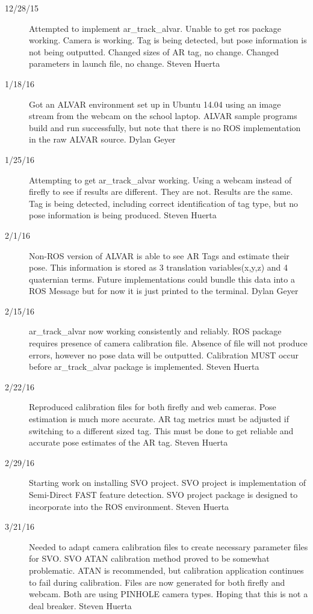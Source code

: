 \begin{description}
\item [12/28/15]  Attempted to implement ar\_track\_alvar. Unable to get ros package working. Camera is working. Tag is being detected, but pose information is not being outputted. Changed sizes of AR tag, no change. Changed parameters in launch file, no change. \hfill{Steven Huerta}

\item [1/18/16] Got an ALVAR environment set up in Ubuntu 14.04 using an image stream from the webcam on the school laptop. ALVAR sample programs build and run successfully, but note that there is no ROS implementation in the raw ALVAR source.  \hfill{Dylan Geyer}

\item [1/25/16]  Attempting to get ar\_track\_alvar working. Using a webcam instead of firefly to see if results are different. They are not. Results are the same. Tag is being detected, including correct identification of tag type, but no pose information is being produced.  \hfill{Steven Huerta}


\item [2/1/16]  Non-ROS version of ALVAR is able to see AR Tags and estimate their pose. This information is stored as 3 translation variables(x,y,z) and 4 quaternian terms. Future implementations could bundle this data into a ROS Message but for now it is just printed to the terminal. \hfill{Dylan Geyer}

\item [2/15/16]  ar\_track\_alvar now working consistently and reliably. ROS package requires presence of camera calibration file. Absence of file will not produce errors, however no pose data will be outputted. Calibration MUST occur before ar\_track\_alvar package is implemented. \hfill{Steven Huerta}

\item [2/22/16]  Reproduced calibration files for both firefly and web cameras. Pose estimation is much more accurate. AR tag metrics must be adjusted if switching to a different sized tag. This must be done to get reliable and accurate pose estimates of the AR tag. \hfill{Steven Huerta}

\item [2/29/16]  Starting work on installing SVO project. SVO project is implementation of Semi-Direct FAST feature detection. SVO project package is designed to incorporate into the ROS environment. \hfill{Steven Huerta}

\item [3/21/16]  Needed to adapt camera calibration files to create necessary parameter files for SVO. SVO ATAN calibration method proved to be somewhat problematic. ATAN is recommended, but calibration application continues to fail during calibration. Files are now generated for both firefly and webcam. Both are using PINHOLE camera types. Hoping that this is not a deal breaker.  \hfill{Steven Huerta}


\end{description}

